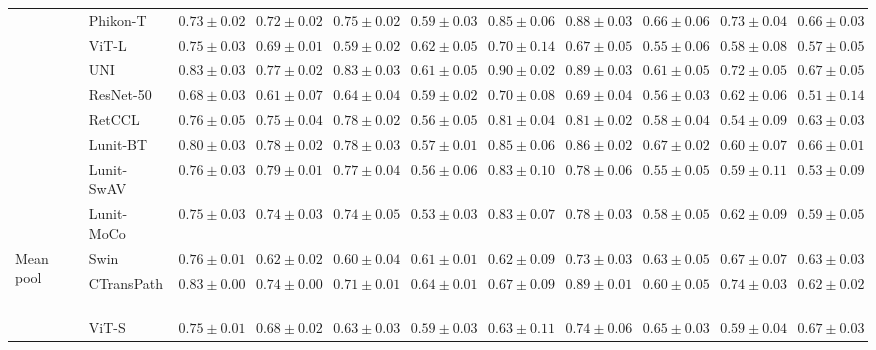 \begin{tabular}{ll|cccc|c|cccc}
 & Phikon-T~\cite{filiot2023scaling} & $0.73 \pm 0.02$ & $0.72 \pm 0.02$ & $0.75 \pm 0.02$ & $0.59 \pm 0.03$ & $0.85 \pm 0.06$ & $0.88 \pm 0.03$ & $0.66 \pm 0.06$ & $\mathbf{0.73 \pm 0.04}$ & $0.66 \pm 0.03$ \\
 & ViT-L~\cite{kolesnikov2021image} & $0.75 \pm 0.03$ & $0.69 \pm 0.01$ & $0.59 \pm 0.02$ & $\mathbf{0.62 \pm 0.05}$ & $0.70 \pm 0.14$ & $0.67 \pm 0.05$ & $0.55 \pm 0.06$ & $0.58 \pm 0.08$ & $0.57 \pm 0.05$ \\
 & UNI~\cite{chen2024uni} & $\mathbf{0.83 \pm 0.03}$ & $0.77 \pm 0.02$ & $\mathbf{0.83 \pm 0.03}$ & $0.61 \pm 0.05$ & $\mathbf{0.90 \pm 0.02}$ & $\mathbf{0.89 \pm 0.03}$ & $0.61 \pm 0.05$ & $0.72 \pm 0.05$ & $0.67 \pm 0.05$ \\
 & ResNet-50~\cite{he2015deep} & $0.68 \pm 0.03$ & $0.61 \pm 0.07$ & $0.64 \pm 0.04$ & $0.59 \pm 0.02$ & $0.70 \pm 0.08$ & $0.69 \pm 0.04$ & $0.56 \pm 0.03$ & $0.62 \pm 0.06$ & $0.51 \pm 0.14$ \\
 & RetCCL~\cite{wang2023retccl} & $0.76 \pm 0.05$ & $0.75 \pm 0.04$ & $0.78 \pm 0.02$ & $0.56 \pm 0.05$ & $0.81 \pm 0.04$ & $0.81 \pm 0.02$ & $0.58 \pm 0.04$ & $0.54 \pm 0.09$ & $0.63 \pm 0.03$ \\
 & Lunit-BT~\cite{kang2023benchmarking} & $0.80 \pm 0.03$ & $0.78 \pm 0.02$ & $0.78 \pm 0.03$ & $0.57 \pm 0.01$ & $0.85 \pm 0.06$ & $0.86 \pm 0.02$ & $\mathbf{0.67 \pm 0.02}$ & $0.60 \pm 0.07$ & $0.66 \pm 0.01$ \\
 & Lunit-SwAV~\cite{kang2023benchmarking} & $0.76 \pm 0.03$ & $0.79 \pm 0.01$ & $0.77 \pm 0.04$ & $0.56 \pm 0.06$ & $0.83 \pm 0.10$ & $0.78 \pm 0.06$ & $0.55 \pm 0.05$ & $0.59 \pm 0.11$ & $0.53 \pm 0.09$ \\
 & Lunit-MoCo~\cite{kang2023benchmarking} & $0.75 \pm 0.03$ & $0.74 \pm 0.03$ & $0.74 \pm 0.05$ & $0.53 \pm 0.03$ & $0.83 \pm 0.07$ & $0.78 \pm 0.03$ & $0.58 \pm 0.05$ & $0.62 \pm 0.09$ & $0.59 \pm 0.05$ \\
\cline{1-11}
\multirow[t]{14}{*}{Mean pool} & Swin~\cite{liu2021swin} & $0.76 \pm 0.01$ & $0.62 \pm 0.02$ & $0.60 \pm 0.04$ & $0.61 \pm 0.01$ & $0.62 \pm 0.09$ & $0.73 \pm 0.03$ & $0.63 \pm 0.05$ & $0.67 \pm 0.07$ & $0.63 \pm 0.03$ \\
 & CTransPath~\cite{wang2022transformer} & $\mathbf{0.83 \pm 0.00}$ & $0.74 \pm 0.00$ & $0.71 \pm 0.01$ & $\mathbf{0.64 \pm 0.01}$ & $0.67 \pm 0.09$ & $0.89 \pm 0.01$ & $0.60 \pm 0.05$ & $0.74 \pm 0.03$ & $0.62 \pm 0.02$ \\
 & ViT-S~\cite{kolesnikov2021image} & $0.75 \pm 0.01$ & $0.68 \pm 0.02$ & $0.63 \pm 0.03$ & $0.59 \pm 0.03$ & $0.63 \pm 0.11$ & $0.74 \pm 0.06$ & $0.65 \pm 0.03$ & $0.59 \pm 0.04$ & $0.67 \pm 0.03$ \\

\end{tabular}
